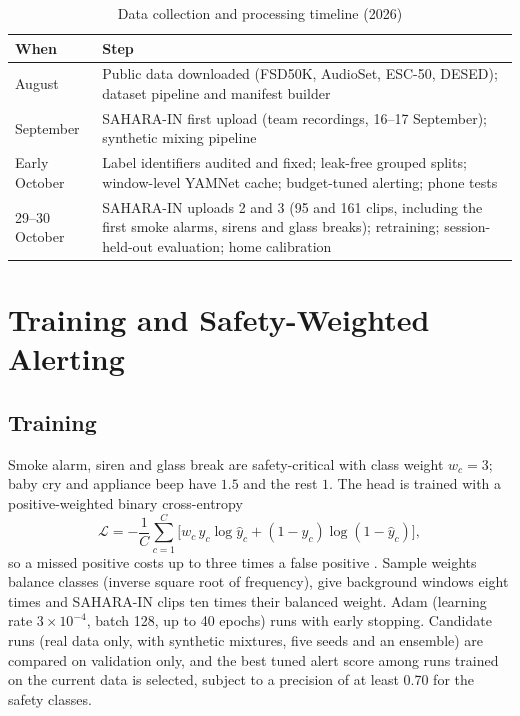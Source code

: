 \documentclass[12pt,a4paper,oneside]{report}
\begin{document}
\begin{table}[h]
\caption{Data collection and processing timeline (2026)}
\label{tab:timeline}
\centering\small
\begin{tabularx}{\textwidth}{@{}lX@{}}
\toprule
When & Step\\
\midrule
August & Public data downloaded (FSD50K, AudioSet, ESC-50, DESED); dataset pipeline and manifest builder\\
September & SAHARA-IN first upload (team recordings, 16--17 September); synthetic mixing pipeline\\
Early October & Label identifiers audited and fixed; leak-free grouped splits; window-level YAMNet cache; budget-tuned alerting; phone tests\\
29--30 October & SAHARA-IN uploads 2 and 3 (95 and 161 clips, including the first smoke alarms, sirens and glass breaks); retraining; session-held-out evaluation; home calibration\\
\bottomrule
\end{tabularx}
\end{table}

\section{Training and Safety-Weighted Alerting}
\subsection{Training}
Smoke alarm, siren and glass break are safety-critical with class weight $w_c=3$; baby cry and appliance beep have $1.5$ and the rest $1$. The head is trained with a positive-weighted binary cross-entropy
\begin{equation}
\mathcal{L} = -\frac{1}{C}\sum_{c=1}^{C}\Big[w_c\,y_c\log\hat{y}_c + (1-y_c)\log(1-\hat{y}_c)\Big],
\end{equation}
so a missed positive costs up to three times a false positive \cite{elkan2001}. Sample weights balance classes (inverse square root of frequency), give background windows eight times and SAHARA-IN clips ten times their balanced weight. Adam (learning rate $3\times10^{-4}$, batch 128, up to 40 epochs) runs with early stopping. Candidate runs (real data only, with synthetic mixtures, five seeds and an ensemble) are compared on validation only, and the best tuned alert score among runs trained on the current data is selected, subject to a precision of at least 0.70 for the safety classes.
\end{document}
